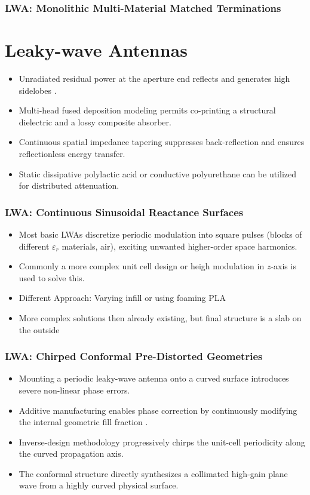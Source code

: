 \documentclass[aspectratio=43]{beamer}
\begin{document}
\begin{frame}[fragile]
  \frametitle{LWA: Monolithic Multi-Material Matched Terminations}
	\section{Leaky-wave Antennas}
  \begin{itemize}
    \item Unradiated residual power at the aperture end reflects and generates high sidelobes .
    \item Multi-head fused deposition modeling permits co-printing a structural dielectric and a lossy composite absorber.
    \item Continuous spatial impedance tapering suppresses back-reflection and ensures reflectionless energy transfer.
    \item Static dissipative polylactic acid or conductive polyurethane can be utilized for distributed attenuation.
  \end{itemize}
\end{frame}

\begin{frame}[fragile]
  \frametitle{LWA: Continuous Sinusoidal Reactance Surfaces}
  \begin{itemize}
		\item Most basic LWAs discretize periodic modulation into square pulses (blocks of different $\varepsilon_r$ materials, air), exciting unwanted higher-order space harmonics.
		\item Commonly a more complex unit cell design or heigh modulation in $z$-axis is used to solve this.
		\item Different Approach: Varying infill or using foaming PLA
		\item More complex solutions then already existing, but final structure is a slab on the outside
  \end{itemize}
\end{frame}

\begin{frame}[fragile]
  \frametitle{LWA: Chirped Conformal Pre-Distorted Geometries}
  \begin{itemize}
    \item Mounting a periodic leaky-wave antenna onto a curved surface introduces severe non-linear phase errors.
    \item Additive manufacturing enables phase correction by continuously modifying the internal geometric fill fraction .
    \item Inverse-design methodology progressively chirps the unit-cell periodicity along the curved propagation axis.
    \item The conformal structure directly synthesizes a collimated high-gain plane wave from a highly curved physical surface.
  \end{itemize}
\end{frame}
\end{document}
